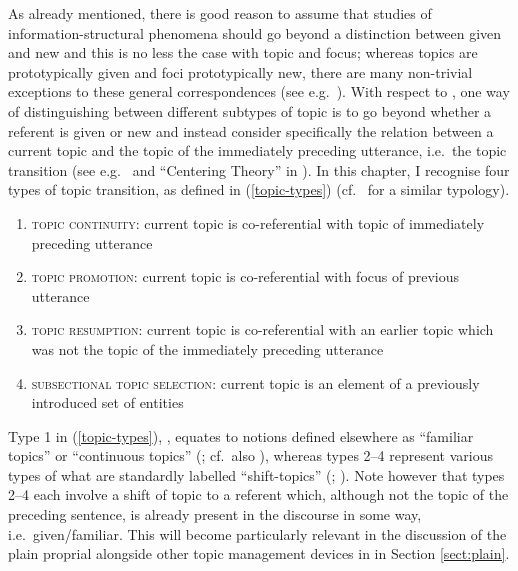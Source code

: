 \documentclass[output=paper,colorlinks,citecolor=brown]{langscibook}
\begin{document}
\begin{sloppypar}
As already mentioned, there is good reason to assume that studies of information-structural phenomena should go  beyond a distinction between given and new and this is no less the case with topic and focus; whereas topics are prototypically given and foci prototypically new, there are many non-trivial exceptions to these general correspondences (see e.g.~\citealp{cook2013identifying}). With respect to , one way of distinguishing between different subtypes of topic is to go beyond whether a referent is given or new and instead consider specifically the relation between a current topic and the topic of the immediately preceding utterance, i.e.~the topic transition (see e.g.~\citealp{danes1974functional} and ``Centering Theory'' in \citealp{groszetal95}). In this chapter, I recognise four types of topic transition, as defined in (\ref{topic-types}) (cf.~\citealp{NapolesRiester2021} for a similar typology).
\end{sloppypar}

\ea \label{topic-types}
\begin{enumerate}[noitemsep]
    \item \textsc{topic continuity}: current topic is co-referential with topic of immediately preceding utterance
        \item \textsc{topic promotion}: current topic is co-referential with focus of previous utterance
    \item \textsc{topic resumption}: current topic is co-referential with an earlier topic which was not the topic of the immediately preceding utterance
     \item \textsc{subsectional topic selection}: current topic is an element of a previously introduced set of entities
\end{enumerate}
\z 

Type 1 in (\ref{topic-types}), , equates to notions defined elsewhere as ``familiar topics'' \citep{frascarelli2007types} or ``continuous topics'' (\citealp{bianchi2010topic}; cf.~also \citealp{givon1983topic}), whereas types 2--4 represent various types of what are standardly labelled ``shift-topics'' (\citealp{frascarelli2007types}; \citealp{bianchi2010topic}). Note however that types 2--4 each involve a shift of topic to a referent which, although not the topic of the preceding sentence, is already present in the discourse in some way, i.e.~given/familiar. This will become particularly relevant in the discussion of the plain proprial  alongside other topic management devices in  in Section \ref{sect:plain}.
\end{document}
